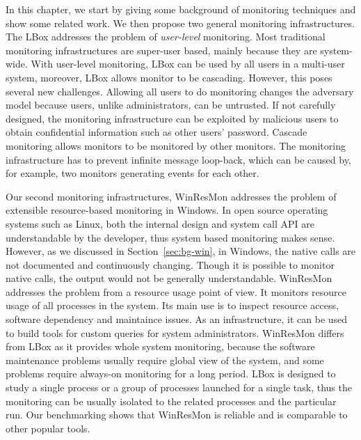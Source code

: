 In this chapter, we start by giving some background of monitoring techniques
and show some related work.
We then propose two general monitoring infrastructures.
The LBox addresses the problem of {\em user-level} monitoring.
Most traditional monitoring infrastructures are super-user based,
mainly because they are system-wide.
With user-level monitoring, LBox can be used by all users in a multi-user
system, moreover, LBox allows monitor to be cascading.
However, this poses several new challenges.
Allowing all users to do monitoring changes the adversary model because
users, unlike administrators, can be untrusted.
If not carefully designed, the monitoring infrastructure can be exploited
by malicious users to obtain confidential information such as other
users' password.
Cascade monitoring allows monitors to be monitored by other monitors.
The monitoring infrastructure has to prevent infinite message loop-back,
which can be caused by, for example, two monitors generating events for
each other.

Our second monitoring infrastructures, WinResMon addresses the problem
of extensible resource-based monitoring in Windows.
In open source operating systems such as Linux,
both the internal design and system call API are understandable by
the developer, thus system based monitoring makes sense.
However, as we discussed in Section~\ref{sec:bg-win},
in Windows, the native calls are not documented and continuously
changing.
Though it is possible to monitor native calls, the output would not be
generally understandable.
WinResMon addresses the problem from a resource usage point of view.
It monitors resource usage of all processes in the system.
Its main use is to inspect resource access, software dependency and
maintaince issues.
As an infrastructure, it can be used to build tools for custom queries
for system administrators.
WinResMon differs from LBox as it provides whole system monitoring,
because the software maintenance problems usually require global view
of the system,
and some problems require always-on monitoring for a long period.
LBox is designed to study a single process or a group of processes launched
for a single task, thus
the monitoring can be usually isolated to the related processes and
the particular run.
Our benchmarking shows that WinResMon is reliable and is
comparable to other popular tools.
